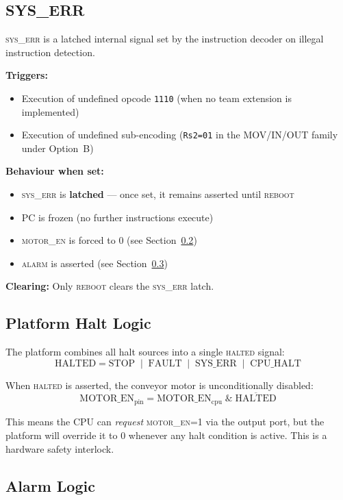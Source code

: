 \documentclass[11pt,a4paper]{article}
\newcommand{\signal}[1]{\textsc{#1}}
\begin{document}
\subsection{SYS\_ERR}

\signal{sys\_err} is a latched internal signal set by the instruction decoder on illegal instruction detection.

\textbf{Triggers:}
\begin{itemize}[nosep]
  \item Execution of undefined opcode \texttt{1110} (when no team extension is implemented)
  \item Execution of undefined sub-encoding (\texttt{Rs2=01} in the MOV/IN/OUT family under Option~B)
\end{itemize}

\textbf{Behaviour when set:}
\begin{itemize}[nosep]
  \item \signal{sys\_err} is \textbf{latched} --- once set, it remains asserted until \signal{reboot}
  \item PC is frozen (no further instructions execute)
  \item \signal{motor\_en} is forced to 0 (see Section~\ref{sec:haltlogic})
  \item \signal{alarm} is asserted (see Section~\ref{sec:alarm})
\end{itemize}

\textbf{Clearing:} Only \signal{reboot} clears the \signal{sys\_err} latch.

\subsection{Platform Halt Logic}\label{sec:haltlogic}

The platform combines all halt sources into a single \signal{halted} signal:
\[
  \text{HALTED} = \text{STOP} \;\mathbin{|}\; \text{FAULT} \;\mathbin{|}\; \text{SYS\_ERR} \;\mathbin{|}\; \text{CPU\_HALT}
\]

When \signal{halted} is asserted, the conveyor motor is unconditionally disabled:
\[
  \text{MOTOR\_EN}_{\text{pin}} = \text{MOTOR\_EN}_{\text{cpu}} \;\mathbin{\&}\; \overline{\text{HALTED}}
\]

This means the CPU can \emph{request} \signal{motor\_en}=1 via the output port, but the platform will override it to 0 whenever any halt condition is active. This is a hardware safety interlock.

\subsection{Alarm Logic}\label{sec:alarm}
\end{document}
